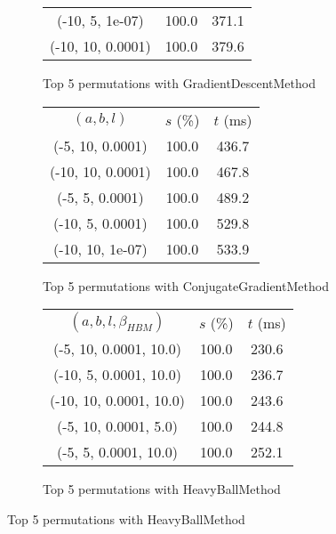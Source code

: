 \begin{figure}[H]
\begin{subfigure}[ht]{.5\textwidth}
\begin{tabular}{|c|c|c|}
(-10, 5, 1e-07) & 100.0 & 371.1 \\
(-10, 10, 0.0001) & 100.0 & 379.6 \\
\hline
\end{tabular}
\caption{Top 5 permutations with GradientDescentMethod}
\label{subfig:param_comp_MatrixSquareSum_GradientDescentMethod_GoldenSectionSearch}
\end{subfigure}
\hfill
\begin{subfigure}[ht]{.5\textwidth}
\begin{tabular}{|c|c|c|}
\hline
\rowcolor{gray!25}
\multicolumn{3}{|c|}{ConjugateGradientMethod} \\
\hline
\rowcolor{gray!25}
$(a,b,l)$ & $s$ (\%) & $t$ (ms) \\
\hline
(-5, 10, 0.0001) & 100.0 & 436.7 \\
(-10, 10, 0.0001) & 100.0 & 467.8 \\
(-5, 5, 0.0001) & 100.0 & 489.2 \\
(-10, 5, 0.0001) & 100.0 & 529.8 \\
(-10, 10, 1e-07) & 100.0 & 533.9 \\
\hline
\end{tabular}
\caption{Top 5 permutations with ConjugateGradientMethod}
\label{subfig:param_comp_MatrixSquareSum_ConjugateGradientMethod_GoldenSectionSearch}
\end{subfigure}
\hfill
\begin{subfigure}[ht]{.5\textwidth}
\begin{tabular}{|c|c|c|}
\hline
\rowcolor{gray!25}
\multicolumn{3}{|c|}{HeavyBallMethod} \\
\hline
\rowcolor{gray!25}
$(a,b,l,\beta_{HBM})$ & $s$ (\%) & $t$ (ms) \\
\hline
(-5, 10, 0.0001, 10.0) & 100.0 & 230.6 \\
(-10, 5, 0.0001, 10.0) & 100.0 & 236.7 \\
(-10, 10, 0.0001, 10.0) & 100.0 & 243.6 \\
(-5, 10, 0.0001, 5.0) & 100.0 & 244.8 \\
(-5, 5, 0.0001, 10.0) & 100.0 & 252.1 \\
\hline
\end{tabular}
\caption{Top 5 permutations with HeavyBallMethod}
\label{subfig:param_comp_MatrixSquareSum_HeavyBallMethod_GoldenSectionSearch}
\end{subfigure}
\end{figure}

